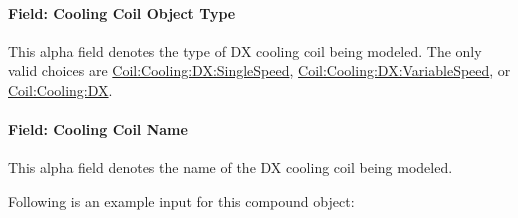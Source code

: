 \paragraph{Field: Cooling Coil Object Type}\label{field-cooling-coil-object-type-1}

This alpha field denotes the type of DX cooling coil being modeled. The only valid choices are \hyperref[coilcoolingdxsinglespeed]{Coil:Cooling:DX:SingleSpeed}, \hyperref[coilcoolingdxvariablespeed]{Coil:Cooling:DX:VariableSpeed}, or \hyperref[coilcoolingdx]{Coil:Cooling:DX}.

\paragraph{Field: Cooling Coil Name}\label{field-cooling-coil-name-1}

This alpha field denotes the name of the DX cooling coil being modeled.

Following is an example input for this compound object:

